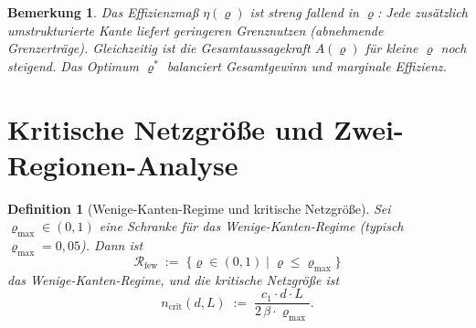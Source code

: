 ﻿\documentclass[12pt, a4paper, openany]{report}
\newtheorem{definition}[theorem]{Definition}
\newtheorem{remark}[theorem]{Bemerkung}
\newcommand{\calR}{\mathcal{R}}
\begin{document}
\begin{remark}
Das Effizienzmaß $\eta(\varrho)$ ist streng fallend in $\varrho$: Jede
zusätzlich umstrukturierte Kante liefert geringeren Grenznutzen (abnehmende
Grenzerträge).  Gleichzeitig ist die Gesamtaussagekraft $A(\varrho)$ für
kleine $\varrho$ noch steigend.  Das Optimum $\varrho^*$ balanciert
Gesamtgewinn und marginale Effizienz.
\end{remark}

\section{Kritische Netzgröße und Zwei-Regionen-Analyse}
\label{sec:scaling_crit}

\begin{definition}[Wenige-Kanten-Regime und kritische Netzgröße]
\label{def:few_edges}
Sei $\varrho_{\max} \in (0, 1)$ eine Schranke für das
Wenige-Kanten-Regime (typisch $\varrho_{\max} = 0{,}05$).  Dann ist
\[
  \calR_{\mathrm{few}} \;:=\; \bigl\{\varrho \in (0,1)
  \;\big|\; \varrho \leq \varrho_{\max}\bigr\}
\]
das \emph{Wenige-Kanten-Regime}, und die \emph{kritische Netzgröße} ist
\begin{equation}
  \label{eq:n_crit}
  n_{\mathrm{crit}}(d, L)
  \;:=\;
  \frac{c_1 \cdot d \cdot L}{2\,\beta \cdot \varrho_{\max}}.
\end{equation}
\end{definition}
\end{document}
